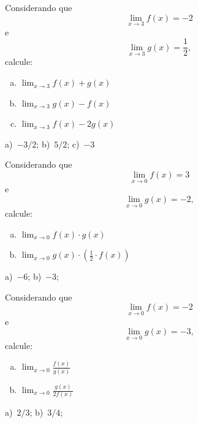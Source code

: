 \begin{exer}
  Considerando que
  \begin{equation}
    \lim_{x\to 3} f(x) = -2
  \end{equation}
  e
  \begin{equation}
    \lim_{x\to 3} g(x) = \frac{1}{2},
  \end{equation}
  calcule:
  \begin{enumerate}[a)]
  \item $\displaystyle\lim_{x\to 3} f(x)+g(x)$
  \item $\displaystyle\lim_{x\to 3} g(x)-f(x)$
  \item $\displaystyle\lim_{x\to 3} f(x)-2g(x)$
  \end{enumerate}
\end{exer}
\begin{resp}
  a)~$-3/2$; b)~$5/2$; c)~$-3$
\end{resp}

\begin{exer}
  Considerando que
  \begin{equation}
    \lim_{x\to 0} f(x) = 3
  \end{equation}
  e
  \begin{equation}
    \lim_{x\to 0} g(x) = -2,
  \end{equation}
  calcule:
  \begin{enumerate}[a)]
  \item $\displaystyle\lim_{x\to 0} f(x)\cdot g(x)$
  \item $\displaystyle\lim_{x\to 0} g(x)\cdot (\frac{1}{2}\cdot f(x))$
  \end{enumerate}
\end{exer}
\begin{resp}
  a)~$-6$; b)~$-3$;
\end{resp}

\begin{exer}
  Considerando que
  \begin{equation}
    \lim_{x\to 0} f(x) = -2
  \end{equation}
  e
  \begin{equation}
    \lim_{x\to 0} g(x) = -3,
  \end{equation}
  calcule:
  \begin{enumerate}[a)]
  \item $\displaystyle\lim_{x\to 0} \frac{f(x)}{g(x)}$
  \item $\displaystyle\lim_{x\to 0} \frac{g(x)}{2f(x)}$
  \end{enumerate}
\end{exer}
\begin{resp}
  a)~$2/3$; b)~$3/4$;
\end{resp}

